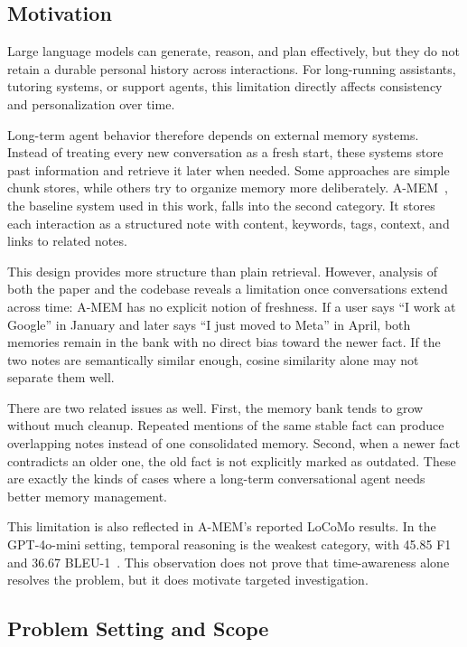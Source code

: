 \documentclass[conference]{IEEEtran}
\begin{document}
\subsection{Motivation}

Large language models can generate, reason, and plan effectively, but they do not retain a durable personal history across interactions. For long-running assistants, tutoring systems, or support agents, this limitation directly affects consistency and personalization over time.

Long-term agent behavior therefore depends on external memory systems. Instead of treating every new conversation as a fresh start, these systems store past information and retrieve it later when needed. Some approaches are simple chunk stores, while others try to organize memory more deliberately. A-MEM~\cite{xu2025amem}, the baseline system used in this work, falls into the second category. It stores each interaction as a structured note with content, keywords, tags, context, and links to related notes.

This design provides more structure than plain retrieval. However, analysis of both the paper and the codebase reveals a limitation once conversations extend across time: A-MEM has no explicit notion of freshness. If a user says ``I work at Google'' in January and later says ``I just moved to Meta'' in April, both memories remain in the bank with no direct bias toward the newer fact. If the two notes are semantically similar enough, cosine similarity alone may not separate them well.

There are two related issues as well. First, the memory bank tends to grow without much cleanup. Repeated mentions of the same stable fact can produce overlapping notes instead of one consolidated memory. Second, when a newer fact contradicts an older one, the old fact is not explicitly marked as outdated. These are exactly the kinds of cases where a long-term conversational agent needs better memory management.

This limitation is also reflected in A-MEM's reported LoCoMo results. In the GPT-4o-mini setting, temporal reasoning is the weakest category, with 45.85 F1 and 36.67 BLEU-1~\cite{xu2025amem,maharana2024locomo}. This observation does not prove that time-awareness alone resolves the problem, but it does motivate targeted investigation.

\subsection{Problem Setting and Scope}
\end{document}
